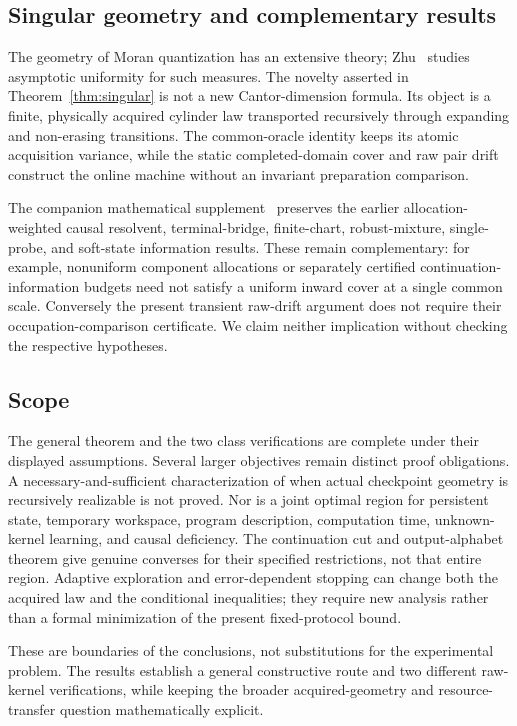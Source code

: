 \subsection{Singular geometry and complementary results}
The geometry of Moran quantization has an extensive theory; Zhu~\cite{zhu-moran} studies asymptotic uniformity for such measures. The novelty asserted in Theorem~\ref{thm:singular} is not a new Cantor-dimension formula. Its object is a finite, physically acquired cylinder law transported recursively through expanding and non-erasing transitions. The common-oracle identity keeps its atomic acquisition variance, while the static completed-domain cover and raw pair drift construct the online machine without an invariant preparation comparison.

The companion mathematical supplement~\cite{supplement} preserves the earlier allocation-weighted causal resolvent, terminal-bridge, finite-chart, robust-mixture, single-probe, and soft-state information results. These remain complementary: for example, nonuniform component allocations or separately certified continuation-information budgets need not satisfy a uniform inward cover at a single common scale. Conversely the present transient raw-drift argument does not require their occupation-comparison certificate. We claim neither implication without checking the respective hypotheses.

\subsection{Scope}
The general theorem and the two class verifications are complete under their displayed assumptions. Several larger objectives remain distinct proof obligations. A necessary-and-sufficient characterization of when actual checkpoint geometry is recursively realizable is not proved. Nor is a joint optimal region for persistent state, temporary workspace, program description, computation time, unknown-kernel learning, and causal deficiency. The continuation cut and output-alphabet theorem give genuine converses for their specified restrictions, not that entire region. Adaptive exploration and error-dependent stopping can change both the acquired law and the conditional inequalities; they require new analysis rather than a formal minimization of the present fixed-protocol bound.

These are boundaries of the conclusions, not substitutions for the experimental problem. The results establish a general constructive route and two different raw-kernel verifications, while keeping the broader acquired-geometry and resource-transfer question mathematically explicit.
